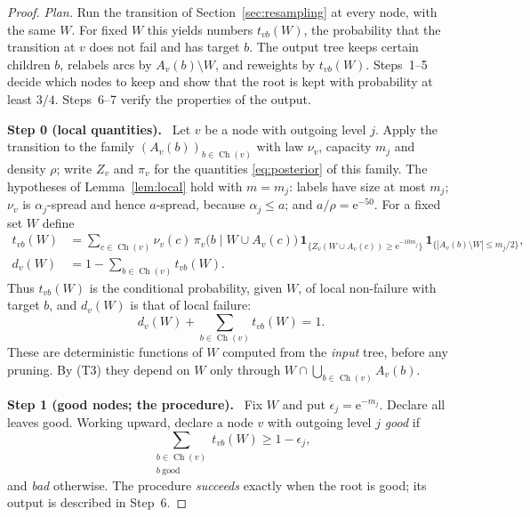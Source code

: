 \documentclass[11pt]{article}
\numberwithin{equation}{section}
\theoremstyle{remark}
\newcommand{\ind}{\mathbf 1}
\newcommand{\ch}{\operatorname{Ch}}
\newcommand{\ee}{\mathrm e}
\newcommand{\step}[1]{\par\medskip\noindent\textbf{#1}\ }
\begin{document}
\begin{proof}
\emph{Plan.} Run the transition of Section~\ref{sec:resampling} at every
node, with the same $W$. For fixed $W$ this yields numbers $t_{vb}(W)$,
the probability that the transition at $v$ does not fail and has target
$b$. The output tree keeps certain children $b$, relabels arcs by
$A_v(b)\setminus W$, and reweights by $t_{vb}(W)$. Steps~1--5 decide
which nodes to keep and show that the root is kept with probability at
least $3/4$. Steps~6--7 verify the properties of the output.

\step{Step 0 (local quantities).} Let $v$ be a node with outgoing level
$j$. Apply the transition to the family $(A_v(b))_{b\in\ch(v)}$ with law
$\nu_v$, capacity $m_j$ and density $\rho$; write $Z_v$ and $\pi_v$ for
the quantities \eqref{eq:posterior} of this family. The hypotheses of
Lemma~\ref{lem:local} hold with $m=m_j$: labels have size at most $m_j$;
$\nu_v$ is $\alpha_j$-spread and hence $a$-spread, because
$\alpha_j\le a$; and $a/\rho=\ee^{-50}$. For a fixed set $W$ define
\begin{align*}
 t_{vb}(W)&=\sum_{c\in\ch(v)}\nu_v(c)\,\pi_v\bigl(b\mid W\cup A_v(c)\bigr)\,
   \ind_{\{Z_v(W\cup A_v(c))\ge\ee^{-10m_j}\}}\,
   \ind_{\{|A_v(b)\setminus W|\le m_j/2\}},\\
 d_v(W)&=1-\sum_{b\in\ch(v)}t_{vb}(W).
\end{align*}
Thus $t_{vb}(W)$ is the conditional probability, given $W$, of local
non-failure with target $b$, and $d_v(W)$ is that of local failure:
\begin{equation}\label{eq:local-masses}
 d_v(W)+\sum_{b\in\ch(v)}t_{vb}(W)=1.
\end{equation}
These are deterministic functions of $W$ computed from the \emph{input}
tree, before any pruning. By (T3) they depend on $W$ only through
$W\cap\bigcup_{b\in\ch(v)}A_v(b)$.

\step{Step 1 (good nodes; the procedure).} Fix $W$ and put
$\epsilon_j=\ee^{-m_j}$. Declare all leaves good. Working upward,
declare a node $v$ with outgoing level $j$ \emph{good} if
\begin{equation}\label{eq:good-node}
 \sum_{\substack{b\in\ch(v)\\b\ \mathrm{good}}}t_{vb}(W)
 \ge1-\epsilon_j,
\end{equation}
and \emph{bad} otherwise. The procedure \emph{succeeds} exactly when the
root is good; its output is described in Step~6.


\end{proof}
\end{document}
